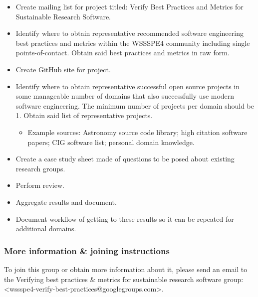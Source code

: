 \begin{itemize}
\item Create mailing list for project titled:  Verify Best Practices and Metrics for Sustainable Research Software.
\item Identify where to obtain representative recommended software engineering best practices and metrics within the WSSSPE4 community including single points-of-contact.  Obtain said best practices and metrics in raw form.
\item Create GitHub site for project.
\item Identify where to obtain representative successful open source projects in some manageable number of domains that also successfully use modern software engineering.  The minimum number of projects per domain should be 1. Obtain said list of representative projects.

\begin{itemize}
\item Example sources: Astronomy source code library; high citation software papers; CIG software list; personal domain knowledge.
\end{itemize}

\item Create a case study sheet made of questions to be posed about existing research groups.
\item Perform review.
\item Aggregate results and document.
\item Document workflow of getting to these results so it can be repeated for additional domains.
\end{itemize}


\subsubsection{More information \& joining instructions}

To join this group or obtain more information about it, please send an email to the Verifying best practices \& metrics for sustainable research software group: <wssspe4-verify-best-practices@googlegroups.com>.
